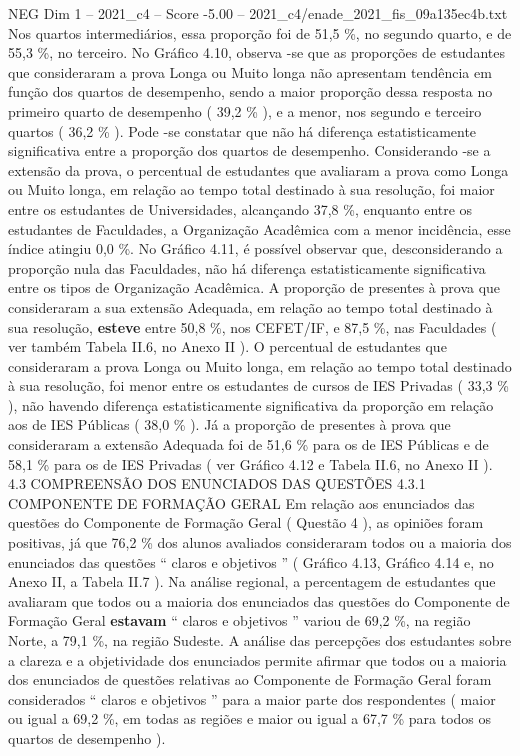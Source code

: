 \begin{textsample}{NEG Dim 1 – 2021\_c4 – Score -5.00 – 2021\_c4/enade\_2021\_fis\_09a135ec4b.txt}
Nos quartos intermediários, essa proporção foi de 51,5 \%, no segundo quarto, e de 55,3 \%, no terceiro.
No Gráfico 4.10, observa -se que as proporções de estudantes que consideraram a prova Longa ou Muito longa não apresentam tendência em função dos quartos de desempenho, sendo a maior proporção dessa resposta no primeiro quarto de desempenho ( 39,2 \% ), e a menor, nos segundo e terceiro quartos ( 36,2 \% ).
Pode -se constatar que não há diferença estatisticamente significativa entre a proporção dos quartos de desempenho.
Considerando -se a extensão da prova, o percentual de estudantes que avaliaram a prova como Longa ou Muito longa, em relação ao tempo total destinado à sua resolução, foi maior entre os estudantes de Universidades, alcançando 37,8 \%, enquanto entre os estudantes de Faculdades, a Organização Acadêmica com a menor incidência, esse índice atingiu 0,0 \%.
No Gráfico 4.11, é possível observar que, desconsiderando a proporção nula das Faculdades, não há diferença estatisticamente significativa entre os tipos de Organização Acadêmica.
A proporção de presentes à prova que consideraram a sua extensão Adequada, em relação ao tempo total destinado à sua resolução, \textbf{esteve} entre 50,8 \%, nos CEFET/IF, e 87,5 \%, nas Faculdades ( ver também Tabela II.6, no Anexo II ).
O percentual de estudantes que consideraram a prova Longa ou Muito longa, em relação ao tempo total destinado à sua resolução, foi menor entre os estudantes de cursos de IES Privadas ( 33,3 \% ), não havendo diferença estatisticamente significativa da proporção em relação aos de IES Públicas ( 38,0 \% ).
Já a proporção de presentes à prova que consideraram a extensão Adequada foi de 51,6 \% para os de IES Públicas e de 58,1 \% para os de IES Privadas ( ver Gráfico 4.12 e Tabela II.6, no Anexo II ). 4.3 COMPREENSÃO DOS ENUNCIADOS DAS QUESTÕES 4.3.1 COMPONENTE DE FORMAÇÃO GERAL Em relação aos enunciados das questões do Componente de Formação Geral ( Questão 4 ), as opiniões foram positivas, já que 76,2 \% dos alunos avaliados consideraram todos ou a maioria dos enunciados das questões “ claros e objetivos ” ( Gráfico 4.13, Gráfico 4.14 e, no Anexo II, a Tabela II.7 ).
Na análise regional, a percentagem de estudantes que avaliaram que todos ou a maioria dos enunciados das questões do Componente de Formação Geral \textbf{estavam} “ claros e objetivos ” variou de 69,2 \%, na região Norte, a 79,1 \%, na região Sudeste.
A análise das percepções dos estudantes sobre a clareza e a objetividade dos enunciados permite afirmar que todos ou a maioria dos enunciados de questões relativas ao Componente de Formação Geral foram considerados “ claros e objetivos ” para a maior parte dos respondentes ( maior ou igual a 69,2 \%, em todas as regiões e maior ou igual a 67,7 \% para todos os quartos de desempenho ).

\end{textsample}
